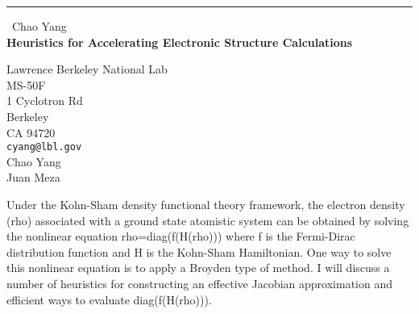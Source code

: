 \documentclass{report}
\begin{document}
\begin{center}
\rule{6in}{1pt} \
{\large Chao Yang \\
{\bf Heuristics for Accelerating Electronic Structure Calculations}}

Lawrence Berkeley National Lab \\ MS-50F \\ 1 Cyclotron Rd \\ Berkeley \\ CA 94720
\\
{\tt cyang@lbl.gov}\\
Chao Yang\\
Juan Meza\end{center}

Under the Kohn-Sham density functional theory framework, the electron
density (rho) associated with a ground state atomistic system can be
obtained by solving the nonlinear equation rho=diag(f(H(rho))) where f is
the Fermi-Dirac distribution function and H is the Kohn-Sham Hamiltonian.
One way to solve this nonlinear equation is to apply a Broyden type of
method. I will discuss a number of heuristics for constructing an
effective Jacobian approximation and efficient ways to evaluate
diag(f(H(rho))).
\end{document}
